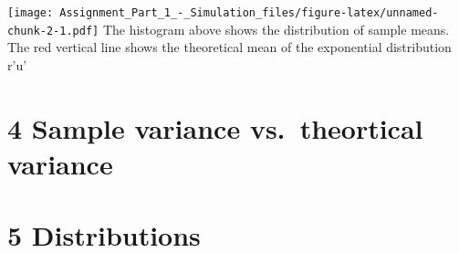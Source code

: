 \documentclass[]{article}
\begin{document}
\texttt{[image: Assignment\_Part\_1\_-\_Simulation\_files/figure-latex/unnamed-chunk-2-1.pdf]}
The histogram above shows the distribution of sample means. The red
vertical line shows the theoretical mean of the exponential distribution
r'u'

\hypertarget{sample-variance-vs.theortical-variance}{%
\section{4 Sample variance vs.~theortical
variance}\label{sample-variance-vs.theortical-variance}}

\hypertarget{distributions}{%
\section{5 Distributions}\label{distributions}}
\end{document}

